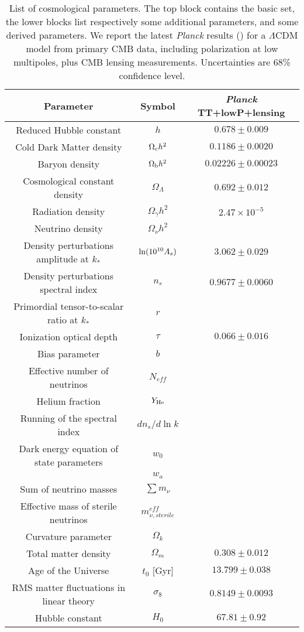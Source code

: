 \begin{table}
 \centering 
 \begin{tabular}{c c c}
  \hline
  \hline
  Parameter&Symbol& \emph{Planck} TT+lowP+lensing\\
  \hline
  Reduced Hubble constant & $h$ & $0.678\pm0.009$\\
  Cold Dark Matter density & $\Omega_{\rm c} h^2$ &$0.1186\pm0.0020$\\
  Baryon density & $\Omega_{\rm b} h^2$  & $0.02226\pm0.00023$ \\
  Cosmological constant density & $\Omega_{\Lambda}$ & $0.692\pm 0.012$\\
  Radiation density & $\Omega_{\gamma}h^2$  & $2.47\times 10^{-5}$\\
  Neutrino density & $\Omega_{\nu}h^2 $ & \\
Density perturbations amplitude at $k_*$ & ${\rm ln}(10^{10} A_s)$& $3.062\pm0.029$\\
Density perturbations spectral index &$n_s$ & $0.9677\pm0.0060$\\
Primordial tensor-to-scalar ratio at $k_*$ & $r$& \\
Ionization optical depth & $\tau$ & $0.066 \pm 0.016$\\
Bias parameter &$b$ &\\
  \hline
Effective number of neutrinos &$N_{eff}$ &\\
Helium fraction &$Y_{\rm He}$&\\
Running of the spectral index &$dn_s/d \ln{k}$&\\
Dark energy equation of state parameters &$w_0$&\\
 &$w_a$&\\
Sum of neutrino masses &$\sum m_{\nu}$ &\\
Effective mass of sterile neutrinos &$ m^{eff}_{\nu,sterile}$&\\
\hline
Curvature parameter&$ \Omega_k$&\\
Total matter density&$\Omega_m$& $0.308 \pm0.012$\\
Age of the Universe& $t_0$ [Gyr] & $13.799\pm0.038$ \\
RMS matter fluctuations in linear theory& $\sigma_8$ & $0.8149\pm0.0093$\\
Hubble constant& $H_0$ & $67.81\pm0.92$\\
\hline
 \end{tabular}
\caption{List of cosmological parameters. The top block contains the basic set, the lower blocks list respectively some additional parameters, and some derived parameters. We report the latest \emph{Planck} results (\citealt{planck16}) for a $\Lambda$CDM model from  primary CMB data, including polarization at low multipoles, plus CMB lensing measurements. Uncertainties are 68\% confidence level. }\label{baseparams}
\end{table}

